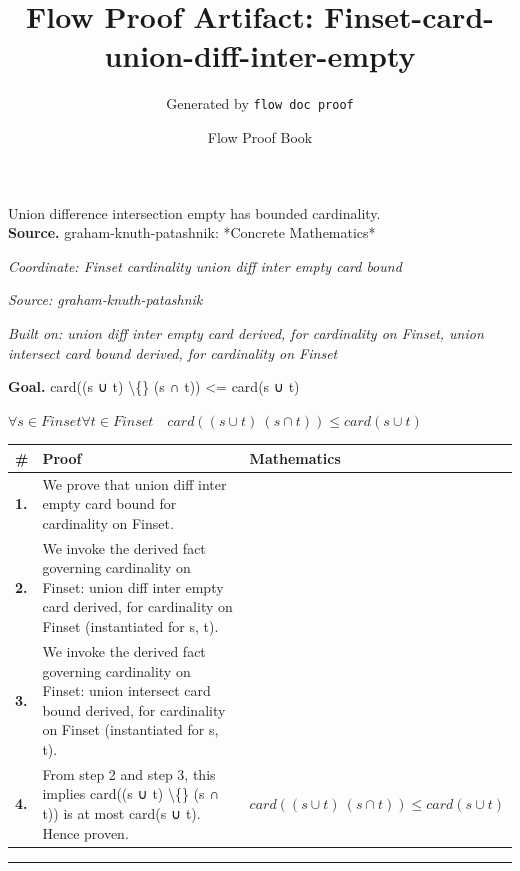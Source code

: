 \documentclass[11pt]{article}
\title{Flow Proof Artifact: Finset-card-union-diff-inter-empty}
\author{Generated by \texttt{flow doc proof}}
\date{Flow Proof Book}
\theoremstyle{definition}
\begin{document}
\maketitle
Union difference intersection empty has bounded cardinality.\\[0.5em]
\textbf{Source.} graham-knuth-patashnik: *Concrete Mathematics*\\[0.5em]
\bigskip
{}\par
\smallskip\noindent\textit{Coordinate: Finset \cdot cardinality \cdot union diff inter empty card bound}\par
\smallskip\noindent\textit{Source: graham-knuth-patashnik}\par
\smallskip\noindent\textit{Built on: union diff inter empty card derived, for cardinality on Finset, union intersect card bound derived, for cardinality on Finset}\par
\medskip
\noindent\textbf{Goal.} card((s ∪ t) \textbackslash\{\} (s ∩ t)) <= card(s ∪ t)\par
\noindent$\displaystyle \forall s \in Finset \forall t \in Finset\quad card((s ∪ t) \ (s ∩ t)) \le card(s ∪ t)$\par
\medskip
\noindent
\begin{tabular}{@{} >{\raggedright\arraybackslash}p{} >{\raggedright\arraybackslash}p{} >{\raggedleft\arraybackslash}p{} @{}}
\textbf{\#} & \textbf{Proof} & \textbf{Mathematics} \\
\midrule
\textbf{1.} & We prove that union diff inter empty card bound for cardinality on Finset. & \\[0.45em]
\textbf{2.} & We invoke the derived fact governing cardinality on Finset: union diff inter empty card derived, for cardinality on Finset (instantiated for s, t). & \\[0.45em]
\textbf{3.} & We invoke the derived fact governing cardinality on Finset: union intersect card bound derived, for cardinality on Finset (instantiated for s, t). & \\[0.45em]
\textbf{4.} & From step 2 and step 3, this implies card((s ∪ t) \textbackslash\{\} (s ∩ t)) is at most card(s ∪ t). Hence proven. & $\displaystyle card((s ∪ t) \ (s ∩ t)) \le card(s ∪ t)$ \\[0.45em]
\bottomrule
\end{tabular}
\label{thm:Finset-cardinality-union_diff_inter_empty_card_bound}
\par\medskip\hrule
\end{document}
